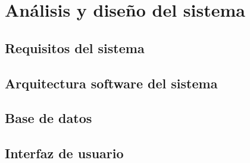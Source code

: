 \chapter{Análisis y diseño del sistema}

\section{Requisitos del sistema}


\section{Arquitectura software del sistema}



\section{Base de datos}


\section{Interfaz de usuario}

